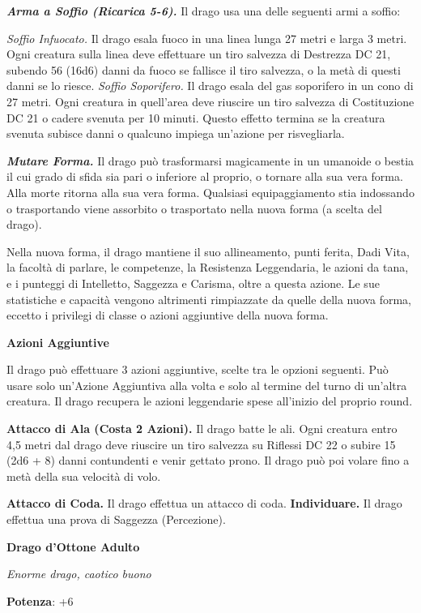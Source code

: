 \begin{multicols}{2}
\emph{\textbf{Arma a Soffio (Ricarica 5-6).}} Il drago usa una delle
seguenti armi a soffio:

\emph{Soffio Infuocato.} Il drago esala fuoco in una linea lunga 27
metri e larga 3 metri. Ogni creatura sulla linea deve effettuare un tiro
salvezza di Destrezza DC 21, subendo 56 (16d6) danni da fuoco se
fallisce il tiro salvezza, o la metà di questi danni se lo riesce.
\emph{Soffio Soporifero.} Il drago esala del gas soporifero in un cono
di 27 metri. Ogni creatura in quell'area deve riuscire un tiro salvezza
di Costituzione DC 21 o cadere svenuta per 10 minuti. Questo effetto
termina se la creatura svenuta subisce danni o qualcuno impiega
un'azione per risvegliarla.

\emph{\textbf{Mutare Forma.}} Il drago può trasformarsi magicamente in
un umanoide o bestia il cui grado di sfida sia pari o inferiore al
proprio, o tornare alla sua vera forma. Alla morte ritorna alla sua vera
forma. Qualsiasi equipaggiamento stia indossando o trasportando viene
assorbito o trasportato nella nuova forma (a scelta del drago).

Nella nuova forma, il drago mantiene il suo allineamento, punti ferita,
Dadi Vita, la facoltà di parlare, le competenze, la Resistenza
Leggendaria, le azioni da tana, e i punteggi di Intelletto, Saggezza e
Carisma, oltre a questa azione. Le sue statistiche e capacità vengono
altrimenti rimpiazzate da quelle della nuova forma, eccetto i privilegi
di classe o azioni aggiuntive della nuova forma.

\textbf{Azioni Aggiuntive}

Il drago può effettuare 3 azioni aggiuntive, scelte tra le opzioni
seguenti. Può usare solo un'Azione Aggiuntiva alla volta e solo al
termine del turno di un'altra creatura. Il drago recupera le azioni
leggendarie spese all'inizio del proprio round.

\textbf{Attacco di Ala (Costa 2 Azioni).} Il drago batte le ali. Ogni
creatura entro 4,5 metri dal drago deve riuscire un tiro salvezza su Riflessi DC 22 o subire 15 (2d6 + 8) danni contundenti e venir gettato
prono. Il drago può poi volare fino a metà della sua velocità di volo.

\textbf{Attacco di Coda.} Il drago effettua un attacco di coda.
\textbf{Individuare.} Il drago effettua una prova di Saggezza
(Percezione).

\textbf{Drago d'Ottone Adulto}

\emph{Enorme drago, caotico buono}

\textbf{Potenza}: +6


\end{multicols}
